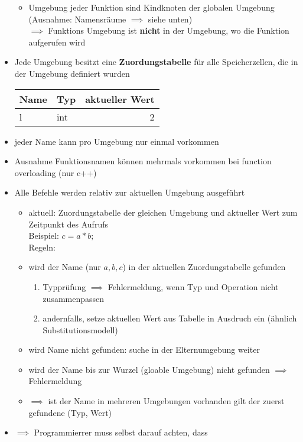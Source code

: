 \documentclass[a4paper]{scrartcl}
\begin{document}
\begin{itemize}
\begin{itemize}
\item Umgebung jeder Funktion sind Kindknoten der globalen Umgebung (Ausnahme: Namensräume $\implies$ siehe unten) \\
      $\implies$ Funktions Umgebung ist \textbf{nicht} in der Umgebung, wo die Funktion aufgerufen wird
\end{itemize}
\item Jede Umgebung besitzt eine \textbf{Zuordungstabelle} für alle Speicherzellen, die in der Umgebung definiert wurden
\begin{center}
\begin{tabular}{llr}
Name & Typ & aktueller Wert\\
\hline
l & int & 2\\
\end{tabular}
\end{center}
\item jeder Name kann pro Umgebung nur einmal vorkommen
\item Ausnahme Funktionsnamen können mehrmals vorkommen bei function overloading (nur c++)
\item Alle Befehle werden relativ zur aktuellen Umgebung ausgeführt
\begin{itemize}
\item aktuell: Zuordungstabelle der gleichen Umgebung und aktueller Wert zum Zeitpunkt des Aufrufs \\
      Beispiel: $c = a * b;$ \\
      Regeln:
\item wird der Name (nur $a, b, c$) in der aktuellen Zuordungstabelle gefunden
\begin{enumerate}
\item Typprüfung $\implies$ Fehlermeldung, wenn Typ und Operation nicht zusammenpassen
\item andernfalls, setze aktuellen Wert aus Tabelle in Ausdruch ein (ähnlich Substitutionsmodell)
\end{enumerate}
\item wird Name nicht gefunden: suche in der Elternumgebung weiter
\item wird der Name bis zur Wurzel (gloable Umgebung) nicht gefunden $\implies$ Fehlermeldung
\item $\implies$ ist der Name in mehreren Umgebungen vorhanden gilt der zuerst gefundene (Typ, Wert)
\end{itemize}
\item $\implies$ Programmierrer muss selbst darauf achten, dass

\end{itemize}
\end{document}
